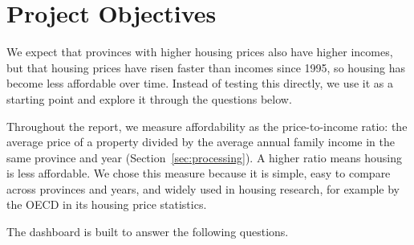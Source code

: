 \section{Project Objectives}
\label{sec:objectives}

We expect that provinces with higher housing prices also have higher incomes, but that housing prices have risen faster than incomes since 1995, so housing has become less affordable over time. Instead of testing this directly, we use it as a starting point and explore it through the questions below.

Throughout the report, we measure affordability as the price-to-income ratio: the average price of a property divided by the average annual family income in the same province and year (Section~\ref{sec:processing}). A higher ratio means housing is less affordable. We chose this measure because it is simple, easy to compare across provinces and years, and widely used in housing research, for example by the OECD in its housing price statistics.

The dashboard is built to answer the following questions.

